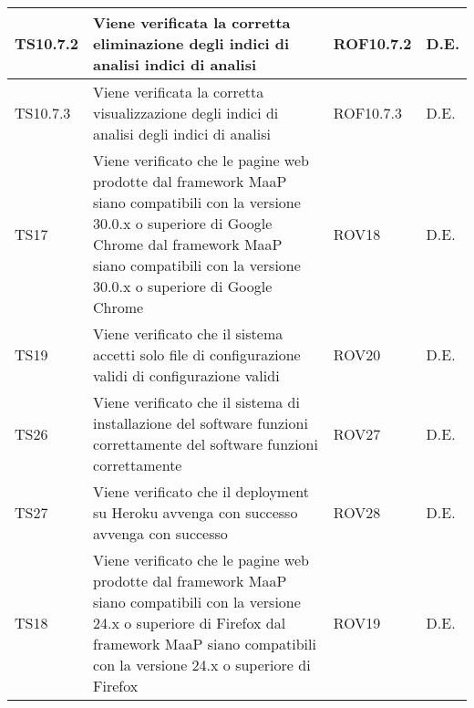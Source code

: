 \begin{center}
\begin{longtable}{|p{2cm}|p{7cm}|p{2cm}|p{2cm}|}
\midrule
TS10.7.2
& Viene verificata la corretta eliminazione degli indici di analisi
indici di analisi
& ROF10.7.2
& D.E.\\


\midrule
TS10.7.3
& Viene verificata la corretta visualizzazione degli indici di analisi
degli indici di analisi
& ROF10.7.3
& D.E.\\


\midrule
TS17
& Viene verificato che le pagine web prodotte dal framework MaaP siano compatibili con la versione 30.0.x o superiore di Google Chrome
dal framework MaaP siano compatibili con la
versione 30.0.x o superiore di Google Chrome
& ROV18
& D.E.\\


\midrule
TS19
& Viene verificato che il sistema accetti solo file di configurazione validi
di configurazione validi
& ROV20
& D.E.\\


\midrule
TS26
& Viene verificato che il sistema di installazione del software funzioni correttamente
del software funzioni correttamente
& ROV27
& D.E.\\


\midrule
TS27
& Viene verificato che il deployment su Heroku avvenga con successo
avvenga con successo
& ROV28
& D.E.\\


\midrule
TS18
& Viene verificato che le pagine web prodotte dal framework MaaP siano compatibili con la versione 24.x o superiore di Firefox
dal framework MaaP siano compatibili con la
versione 24.x o superiore di Firefox
& ROV19
& D.E.\\


\end{longtable}
\end{center}

